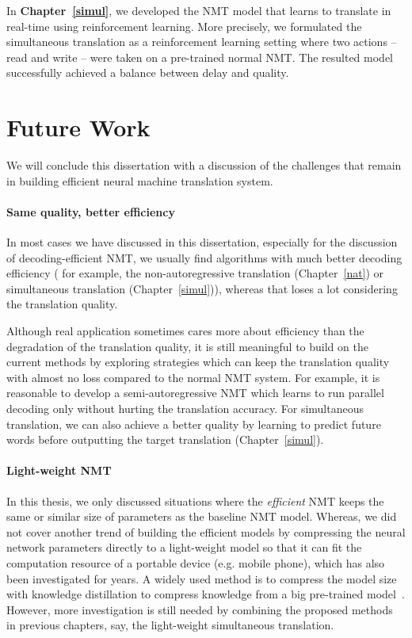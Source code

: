 In \textbf{Chapter~\ref{simul}}, we developed the NMT model that learns to translate in real-time using reinforcement learning. More precisely, we formulated the simultaneous translation as a reinforcement learning setting where two actions -- read and write -- were taken on a pre-trained normal NMT.  The resulted model successfully achieved a balance between delay and quality. 


\section{Future Work}
We will conclude this dissertation with a discussion of the challenges that remain in building efficient neural machine translation system.
\paragraph{Same quality, better efficiency }
In most cases we have discussed in this dissertation, especially for the discussion of decoding-efficient NMT, we usually find algorithms with much better decoding efficiency ( for example, the non-autoregressive translation (Chapter~\ref{nat}) or simultaneous translation (Chapter~\ref{simul})), whereas that loses a lot considering the translation quality. 

Although real application sometimes cares more about efficiency than the degradation of the translation quality, it is still meaningful to build on the current methods by exploring strategies which can keep the translation quality with almost no loss compared to the normal NMT system.  For example, it is reasonable to develop a semi-autoregressive NMT which learns to run parallel decoding only without hurting the translation accuracy. For simultaneous translation, we can also achieve a better  quality by learning to predict future words before outputting the target translation (Chapter~\ref{simul}).


\paragraph{Light-weight NMT}
In this thesis, we only discussed situations where the {\it efficient} NMT keeps the same or similar size of parameters as the baseline NMT model. Whereas, we did not cover another trend of building the efficient models by compressing the neural network parameters directly to a light-weight model so that it can fit the computation resource of a portable device (e.g. mobile phone), which has also been investigated for years. A widely used method is to compress the model size with knowledge distillation to compress knowledge from a big pre-trained model~\cite{kim2016sequence}.  However, more investigation is still needed by combining the proposed methods in previous chapters, say, the light-weight simultaneous translation.

